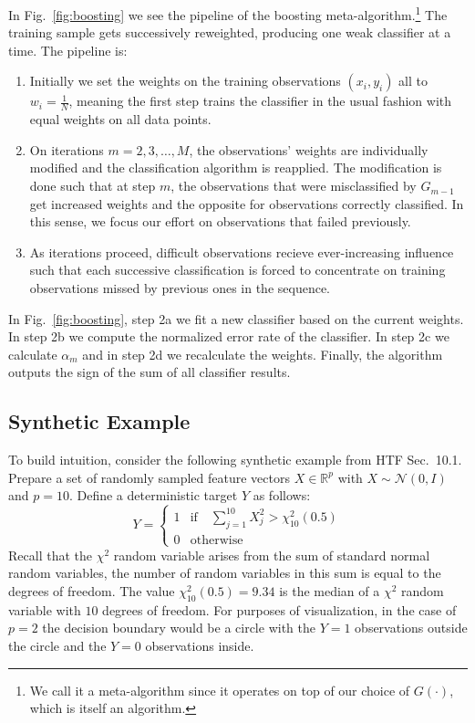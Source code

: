 \documentclass[a4paper]{article}
\begin{document}
In Fig.~\ref{fig:boosting} we see the pipeline of the boosting meta-algorithm.\footnote{We call it a meta-algorithm since it operates on top of our choice of $G(\cdot)$, which is itself an algorithm.} The training sample gets successively reweighted, producing one weak classifier at a time. The pipeline is:
\begin{enumerate}
\item Initially we set the weights on the training observations $(x_i,y_i)$ all to $w_i=\frac{1}{N}$, meaning the first step trains the classifier in the usual fashion with equal weights on all data points.
\item On iterations $m=2,3,\ldots,M$, the observations' weights are individually modified and the classification algorithm is reapplied. The modification is done such that at step $m$, the observations that were misclassified by $G_{m-1}$ get increased weights and the opposite for observations correctly classified. In this sense, we focus our effort on observations that failed previously.
\item As iterations proceed, difficult observations recieve ever-increasing influence such that each successive classification is forced to concentrate on training observations missed by previous ones in the sequence.
\end{enumerate}

In Fig.~\ref{fig:boosting}, step 2a we fit a new classifier based on the current weights. In step 2b we compute the normalized  error rate of the classifier. In step 2c we calculate $\alpha_m$ and in step 2d we recalculate the weights. Finally, the algorithm outputs the sign of the sum of all classifier results. 

\subsection{Synthetic Example}
To build intuition, consider the following synthetic example from HTF Sec.~10.1.  Prepare a set of randomly sampled feature vectors $X\in\mathbb{R}^p$ with $X\sim\mathcal{N}(0,I)$ and $p=10$.  Define a deterministic target $Y$ as follows:
\begin{displaymath}
   Y = \left\{
     \begin{array}{lr}
       1 & \text{if}\quad \sum_{j=1}^{10} X_j ^2> \chi_{10}^2(0.5)\\
       0 & \text{otherwise}
     \end{array}
   \right.
\end{displaymath} 
Recall that the $\chi^2$ random variable arises from the sum of standard normal random variables, the number of random variables in this sum is equal to the degrees of freedom.  The value $\chi_{10}^2(0.5)=9.34$ is the median of a $\chi^2$ random variable with $10$ degrees of freedom.  For purposes of visualization, in the case of $p=2$ the decision boundary would be a circle with the $Y=1$ observations outside the circle and the $Y=0$ observations inside.
\end{document}
